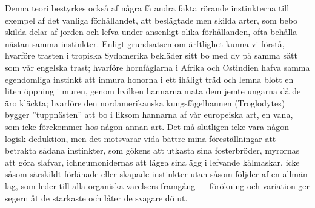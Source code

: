Denna teori bestyrkes också af några få andra fakta rörande instinkterna till exempel af det vanliga förhållandet, att beslägtade men skilda arter, som bebo skilda delar af jorden och lefva under ansenligt olika förhållanden, ofta behålla nästan samma instinkter. Enligt grundsatsen om ärftlighet kunna vi förstå, hvarföre trasten i tropiska Sydamerika bekläder sitt bo med dy på samma sätt som vår engelska trast; hvarföre hornfåglarna i Afrika och Ostindien hafva samma egendomliga instinkt att inmura honorna i ett ihåligt träd och lemna blott en liten öppning i muren, genom hvilken hannarna mata dem jemte ungarna då de äro kläckta; hvarföre den nordamerikanska kungsfågelhannen (Troglodytes) bygger ”tuppnästen” att bo i liksom hannarna af vår europeiska art, en vana, som icke förekommer hos någon annan art. Det må slutligen icke vara någon logisk deduktion, men det motsvarar vida bättre mina föreställningar att betrakta sådana instinkter, som gökens att utkasta sina fosterbröder, myrornas att göra slafvar, ichneumonidernas att lägga sina ägg i lefvande kålmaskar, icke såsom särskildt förlänade eller skapade instinkter utan såsom följder af en allmän lag, som leder till alla organiska varelsers framgång — förökning och variation ger segern åt de starkaste och låter de svagare dö ut.


